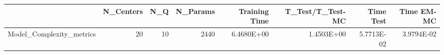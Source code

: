 \begin{tabular}{lrrrrrrr}
\toprule
{} &  N\_Centers &  N\_Q &  N\_Params &  Training Time &  T\_Test/T\_Test-MC &  Time Test &  Time EM-MC \\
\midrule
Model\_Complexity\_metrics &         20 &   10 &      2440 &     6.4680E+00 &        1.4503E+00 & 5.7713E-02 &  3.9794E-02 \\
\bottomrule
\end{tabular}
